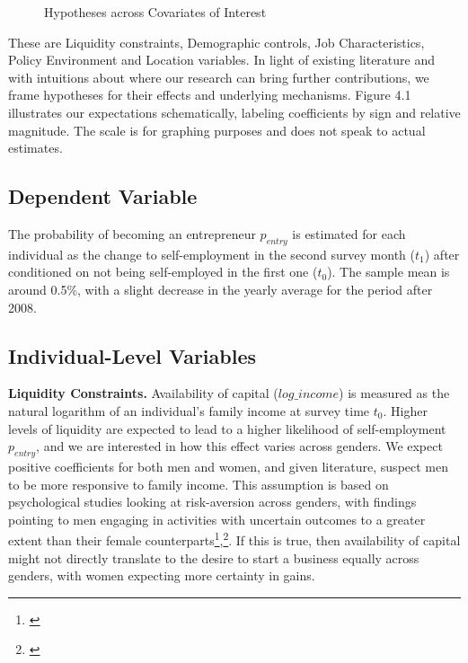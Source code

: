 \begin{figure}[hbtp]
        \caption{Hypotheses across Covariates of Interest}  
\end{figure}

These are Liquidity constraints, Demographic controls, Job Characteristics, Policy Environment and Location variables. In light of existing literature and with intuitions about where our research can bring further contributions, we frame hypotheses for their effects and underlying mechanisms. Figure 4.1 illustrates our expectations schematically, labeling coefficients by sign and relative magnitude. The scale is for graphing purposes and does not speak to actual estimates.


\subsection{Dependent Variable}

The probability of becoming an entrepreneur $p_{entry}$ is estimated for each individual as the change to self-employment in the second survey month ($t_1$) after conditioned on not being self-employed in the first one ($t_0$). The sample mean is around 0.5\%, with a slight decrease in the yearly average for the period after 2008. 



\subsection{Individual-Level Variables}

\textbf{Liquidity Constraints.} Availability of capital ($log\_income$) is measured as the natural logarithm of an individual's family income at survey time $t_0$. Higher levels of liquidity are expected to lead to a higher likelihood of self-employment $p_{entry}$, and we are interested in how this effect varies across genders. We expect positive coefficients for both men and women, and given literature, suspect men to be more responsive to family income. This assumption is based on psychological studies looking at risk-aversion across genders, with findings pointing to men engaging in activities with uncertain outcomes to a greater extent than their female counterparts\footnote{\cite{francis2015gender}}\hspace{.15em},\footnote{\cite{adams2012beyond}}. If this is true, then availability of capital might not directly translate to the desire to start a business equally across genders, with women expecting more certainty in gains.

